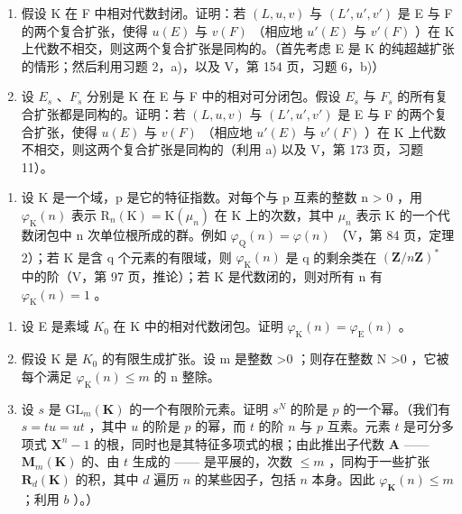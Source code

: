 \begin{enumerate}
\def\labelenumi{\alph{enumi})}
\item
  假设 K 在 F 中相对代数封闭。证明：若 \((L, u, v)\) 与 \((L', u', v')\) 是 E 与 F 的两个复合扩张，使得 \(u(E)\) 与 \(v(F)\) （相应地 \(u'(E)\) 与 \(v'(F)\) ）在 K 上代数不相交，则这两个复合扩张是同构的。（首先考虑 E 是 K 的纯超越扩张的情形；然后利用习题 2，a)，以及 V，第 154 页，习题 6，b)）
\item
  设 \(E_{s}\) 、\(F_{s}\) 分别是 K 在 E 与 F 中的相对可分闭包。假设 \(E_{s}\) 与 \(F_{s}\) 的所有复合扩张都是同构的。证明：若 \((L, u, v)\) 与 \((L', u', v')\) 是 E 与 F 的两个复合扩张，使得 \(u(E)\) 与 \(v(F)\) （相应地 \(u'(E)\) 与 \(v'(F)\) ）在 K 上代数不相交，则这两个复合扩张是同构的（利用 a) 以及 V，第 173 页，习题 11）。
\end{enumerate}

\begin{enumerate}
\def\labelenumi{\arabic{enumi})}
\setcounter{enumi}{4}
\tightlist
\item
  设 K 是一个域，p 是它的特征指数。对每个与 p 互素的整数 n \textgreater{} 0 ，用 \(\varphi_{\mathrm{K}}(n)\) 表示 \(\mathrm{R}_{n}(\mathrm{K}) = \mathrm{K}(\mu_{n})\) 在 K 上的次数，其中 \(\mu_{n}\) 表示 K 的一个代数闭包中 n 次单位根所成的群。例如 \(\varphi_{\mathrm{Q}}(n) = \varphi(n)\) （V，第 84 页，定理 2）；若 K 是含 q 个元素的有限域，则 \(\varphi_{\mathrm{K}}(n)\) 是 q 的剩余类在 \((\mathbf{Z}/n\mathbf{Z})^{*}\) 中的阶（V，第 97 页，推论）；若 K 是代数闭的，则对所有 n 有 \(\varphi_{\mathrm{K}}(n) = 1\) 。
\end{enumerate}

\begin{enumerate}
\def\labelenumi{\alph{enumi})}
\item
  设 E 是素域 \(K_{0}\) 在 K 中的相对代数闭包。证明 \(\varphi_{\mathrm{K}}(n) = \varphi_{\mathrm{E}}(n)\) 。
\item
  假设 K 是 \(K_{0}\) 的有限生成扩张。设 m 是整数 \textgreater0 ；则存在整数 N \textgreater0 ，它被每个满足 \(\varphi_{\mathrm{K}}(n) \leqslant m\) 的 n 整除。
\item
  设 \(s\) 是 \(\mathrm{GL}_m(\mathbf{K})\) 的一个有限阶元素。证明 \(s^N\) 的阶是 \(p\) 的一个幂。（我们有 \(s = tu = ut\) ，其中 \(u\) 的阶是 \(p\) 的幂，而 \(t\) 的阶 \(n\) 与 \(p\) 互素。元素 \(t\) 是可分多项式 \(\mathbf{X}^n - 1\) 的根，同时也是其特征多项式的根；由此推出子代数 \(\mathbf{A}\) —— \(\mathbf{M}_m(\mathbf{K})\) 的、由 \(t\) 生成的 —— 是平展的，次数 \(\leqslant m\) ，同构于一些扩张 \(\mathbf{R}_d(\mathbf{K})\) 的积，其中 \(d\) 遍历 \(n\) 的某些因子，包括 \(n\) 本身。因此 \(\varphi_{\mathbf{K}}(n) \leqslant m\) ；利用 \(b\) ）。）
\end{enumerate}
